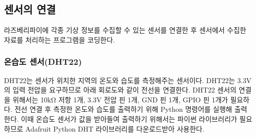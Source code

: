 \subsection{센서의 연결}

라즈베리파이에 각종 기상 정보를 수집할 수 있는 센서를 연결한 후 센서에서 수집한 자료를 처리하는 프로그램을 코딩한다.

\begin{table}[htbp]
	\caption{연구에서 사용한 센서의 목록}
	\label{SENSOR}
\end{table}

\subsubsection{온습도 센서(DHT22)}
DHT22는 센서가 위치한 지역의 온도와 습도를 측정해주는 센서이다. DHT22는 3.3V의 입력 전압을 요구하므로 아래 회로도와 같이 전선을 연결한다. DHT22 센서의 연결을 위해서는 10kΩ 저항 1개, 3.3V 전압 핀 1개, GND 핀 1개, GPIO 핀 1개가 필요하다. 전선 연결 후 측정한 온도와 습도를 출력하기 위해 Python 명령어를 실행해 출력한다. 이때 온습도 센서가 값을 받아들여 출력하기 위해서는 파이썬 라이브러리가 필요하므로 Adafruit Python DHT 라이브러리를 다운로드받아 사용한다.

